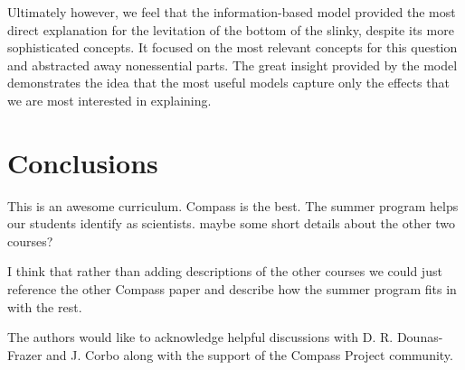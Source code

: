 \documentclass[aps,pre,10pt,superscriptaddress,showpacs,amsmath,amssymb,nofootinbib]{revtex4-1}
\begin{document}
Ultimately however, we feel that the information-based model provided the
most direct explanation for the levitation of the bottom of the slinky, despite
its more sophisticated concepts. It focused
on the most relevant concepts for this question and abstracted away
nonessential parts. The great insight provided by the
model demonstrates the idea that the most useful models
capture only the effects that we are most interested in explaining.

\section{Conclusions}
This is an awesome curriculum.  Compass is the best.  The summer program helps
our students identify as scientists.  maybe some short details about the other
two courses?

I think that rather than adding descriptions of the other courses we could just
reference the other Compass paper and describe how the summer program fits in 
with the rest.


\acknowledgments The authors would like to acknowledge helpful discussions with
D. R. Dounas-Frazer and J. Corbo along with the support of the Compass Project
community.


\end{document}
